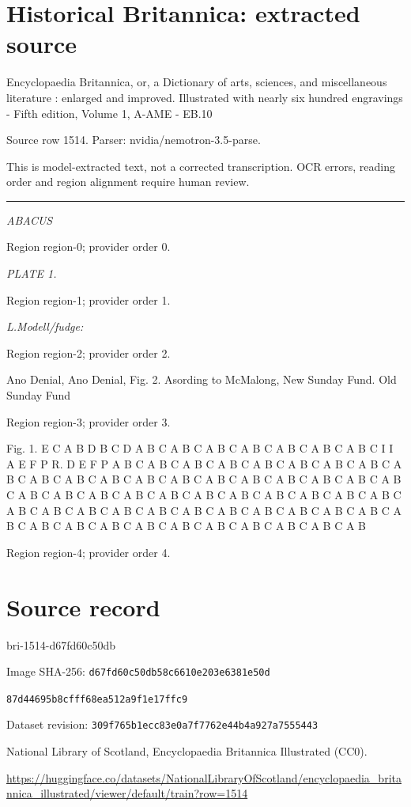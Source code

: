 \documentclass[11pt]{article}
\begin{document}
\section*{Historical Britannica: extracted source}
Encyclopaedia Britannica, or, a Dictionary of arts, sciences, and miscellaneous literature : enlarged and improved. Illustrated with nearly six hundred engravings - Fifth edition, Volume 1, A-AME - EB.10\par
{\small Source row 1514. Parser: nvidia/nemotron-3.5-parse.\par}
{\small This is model-extracted text, not a corrected transcription. OCR errors, reading order and region alignment require human review.\par}
\hrule\medskip
{\small\itshape ABACUS\par}

{\scriptsize\color{gray} Region region-0; provider order 0.\par}
\medskip

{\small\itshape PLATE 1.\par}

{\scriptsize\color{gray} Region region-1; provider order 1.\par}
\medskip

{\small\itshape L.Modell/fudge:\par}

{\scriptsize\color{gray} Region region-2; provider order 2.\par}
\medskip

Ano Denial,
Ano Denial,
Fig. 2.
Asording to McMalong,
New Sunday Fund.
Old Sunday Fund
\par

{\scriptsize\color{gray} Region region-3; provider order 3.\par}
\medskip

Fig. 1.
E
C
A
B
D
B
C
D
A
B
C
A
B
C
A
B
C
A
B
C
A
B
C
A
B
C
A
B
C
I
I
A
E
F
P
R.
D
E
F
P
A
B
C
A
B
C
A
B
C
A
B
C
A
B
C
A
B
C
A
B
C
A
B
C
A
B
C
A
B
C
A
B
C
A
B
C
A
B
C
A
B
C
A
B
C
A
B
C
A
B
C
A
B
C
A
B
C
A
B
C
A
B
C
A
B
C
A
B
C
A
B
C
A
B
C
A
B
C
A
B
C
A
B
C
A
B
C
A
B
C
A
B
C
A
B
C
A
B
C
A
B
C
A
B
C
A
B
C
A
B
C
A
B
C
A
B
C
A
B
C
A
B
C
A
B
C
A
B
C
A
B
C
A
B
C
A
B
C
A
B
C
A
B
C
A
B
C
A
B
C
A
B
C
A
B
C
A
B
\par

{\scriptsize\color{gray} Region region-4; provider order 4.\par}
\medskip
\newpage\section*{Source record}
bri-1514-d67fd60c50db\par
Image SHA-256: \texttt{d67fd60c50db58c6610e203e6381e50d}\par\texttt{87d44695b8cfff68ea512a9f1e17ffc9}\par
Dataset revision: \texttt{309f765b1ecc83e0a7f7}\texttt{762e44b4a927a7555443}\par
National Library of Scotland, Encyclopaedia Britannica Illustrated (CC0).\par
\url{https://huggingface.co/datasets/NationalLibraryOfScotland/encyclopaedia_britannica_illustrated/viewer/default/train?row=1514}
\end{document}

